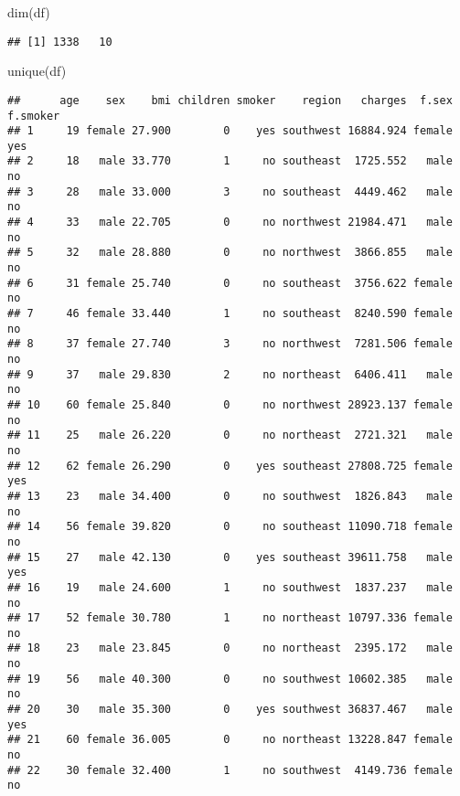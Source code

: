 \documentclass[
]{article}
\newenvironment{Shaded}{\begin{snugshade}}{\end{snugshade}}
\newcommand{\FunctionTok}[1]{\textcolor[rgb]{0.00,0.00,0.00}{#1}}
\newcommand{\NormalTok}[1]{#1}
\begin{document}
\begin{Shaded}
\begin{Highlighting}[]
\FunctionTok{dim}\NormalTok{(df)}
\end{Highlighting}
\end{Shaded}

\begin{verbatim}
## [1] 1338   10
\end{verbatim}

\begin{Shaded}
\begin{Highlighting}[]
\FunctionTok{unique}\NormalTok{(df)}
\end{Highlighting}
\end{Shaded}

\begin{verbatim}
##      age    sex    bmi children smoker    region   charges  f.sex f.smoker
## 1     19 female 27.900        0    yes southwest 16884.924 female      yes
## 2     18   male 33.770        1     no southeast  1725.552   male       no
## 3     28   male 33.000        3     no southeast  4449.462   male       no
## 4     33   male 22.705        0     no northwest 21984.471   male       no
## 5     32   male 28.880        0     no northwest  3866.855   male       no
## 6     31 female 25.740        0     no southeast  3756.622 female       no
## 7     46 female 33.440        1     no southeast  8240.590 female       no
## 8     37 female 27.740        3     no northwest  7281.506 female       no
## 9     37   male 29.830        2     no northeast  6406.411   male       no
## 10    60 female 25.840        0     no northwest 28923.137 female       no
## 11    25   male 26.220        0     no northeast  2721.321   male       no
## 12    62 female 26.290        0    yes southeast 27808.725 female      yes
## 13    23   male 34.400        0     no southwest  1826.843   male       no
## 14    56 female 39.820        0     no southeast 11090.718 female       no
## 15    27   male 42.130        0    yes southeast 39611.758   male      yes
## 16    19   male 24.600        1     no southwest  1837.237   male       no
## 17    52 female 30.780        1     no northeast 10797.336 female       no
## 18    23   male 23.845        0     no northeast  2395.172   male       no
## 19    56   male 40.300        0     no southwest 10602.385   male       no
## 20    30   male 35.300        0    yes southwest 36837.467   male      yes
## 21    60 female 36.005        0     no northeast 13228.847 female       no
## 22    30 female 32.400        1     no southwest  4149.736 female       no

\end{verbatim}
\end{document}

